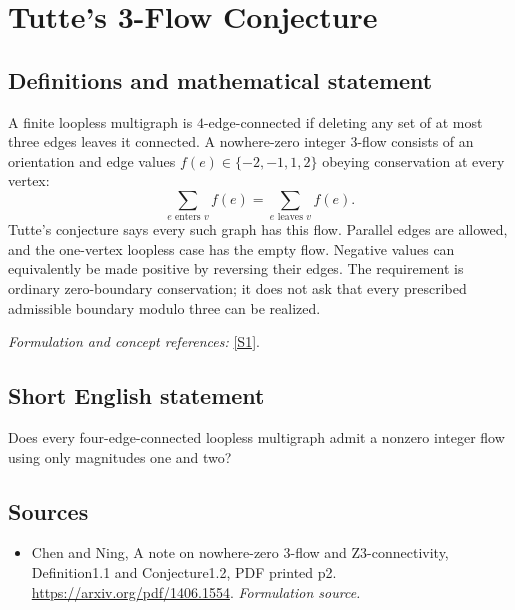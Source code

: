 \documentclass[11pt]{article}
\begin{document}
\section*{\texorpdfstring{Tutte's 3-Flow Conjecture}{Tutte's 3-Flow Conjecture}}\label{350}
\subsection{Definitions and mathematical statement}
A finite loopless multigraph is $4$-edge-connected if deleting any set of at most three edges leaves it connected. A nowhere-zero integer $3$-flow consists of an orientation and edge values $f(e)\in\{-2,-1,1,2\}$ obeying conservation at every vertex:
\[
 \sum_{e\text{ enters }v} f(e)=\sum_{e\text{ leaves }v}f(e).
\]
Tutte's conjecture says every such graph has this flow. Parallel edges are allowed, and the one-vertex loopless case has the empty flow. Negative values can equivalently be made positive by reversing their edges. The requirement is ordinary zero-boundary conservation; it does not ask that every prescribed admissible boundary modulo three can be realized.
\par\smallskip\textit{Formulation and concept references:} \href{https://arxiv.org/pdf/1406.1554}{[S1]}.

\subsection{Short English statement}
Does every four-edge-connected loopless multigraph admit a nonzero integer flow using only magnitudes one and two?
\subsection{Sources}
\begin{itemize}
\item[S1]Chen and Ning, A note on nowhere-zero 3-flow and Z3-connectivity, Definition1.1 and Conjecture1.2, PDF printed p2.
\url{https://arxiv.org/pdf/1406.1554}.
\textit{Formulation source.}
\end{itemize}
\end{document}
